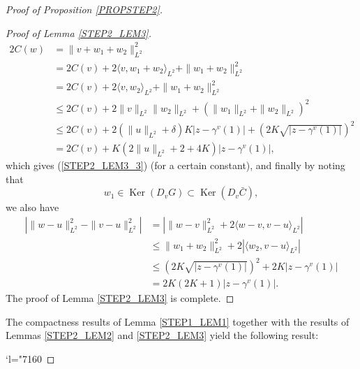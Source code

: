 \documentclass[JEP,XML,SOM,Unicode,NoFloatCountersInSection,published]{cedram}
\newcommand{\Changel}{\mathcode`l="7160}
\DeclareMathOperator{\Ker}{Ker}
\theoremstyle{definition}
\begin{document}
\begin{proof}[Proof of Proposition \ref{PROPSTEP2}]
\begin{proof}[Proof of Lemma \ref{STEP2_LEM3}]
\begin{align*}
2C(w) & = \|v+w_1+w_2\|_{L^2}^2 \\
& =  2C(v) + 2 \langle v,w_1+w_2\rangle_{L^2} + \|w_1+w_2\|_{L^2}^2 \\
& =  2C(v) + 2 \langle v,w_2\rangle_{L^2} + \|w_1+w_2\|_{L^2}^2\\
& \leq  2C(v) + 2 \|v\|_{L^2} \|w_2\|_{L^2} + \left(\|w_1\|_{L^2} + \|w_2\|_{L^2}\right)^2 \\
& \leq  2C(v) + 2 \left(\|u\|_{L^2}+\delta\right) K \left|z-\gamma^v(1)\right| + \left(2K\sqrt{\left|z-\gamma^v(1)\right|}\right)^2\\
& =  2C(v) + K \left(2 \|u\|_{L^2}+2+4K\right) |z-\gamma^v(1)|,
\end{align*}
which gives (\ref{STEP2_LEM3_3}) (for a certain constant), and finally by noting that
\[
w_1 \in \Ker(D_vG)\subset \Ker(D_v\bar{C}),
\]
we also have
\begin{align*}
\left| \| w-u\|_{L^2}^2 - \| v-u\|_{L^2}^2\right| & = \left| \| w-v\|_{L^2}^2 + 2 \langle w-v,v-u\rangle_{L^2} \right| \\
& \leq \| w_1+w_2 \|_{L^2}^2 + 2 \left|\langle w_2 ,v-u\rangle_{L^2}\right| \\
& \leq \left(2K\sqrt{\left|z-\gamma^v(1)\right|}\right)^2 + 2K \left|z-\gamma^v(1)\right|\\
& =  2K(2K+1)|z - \gamma^v(1)|.
\end{align*}
The proof of Lemma \ref{STEP2_LEM3} is complete.
\end{proof}

The compactness results of Lemma \ref{STEP1_LEM1} together with the results of Lemmas \ref{STEP2_LEM2} and \ref{STEP2_LEM3} yield the following result:

\Changel


\end{proof}
\end{document}
